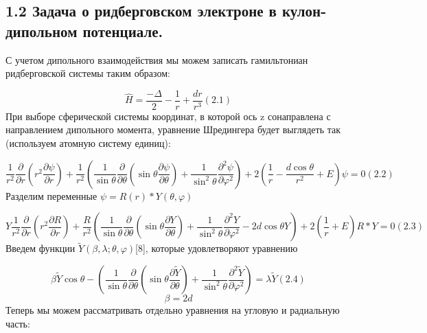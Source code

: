 \documentclass[a4paper]{article}
\begin{document}
\subsection{1.2 Задача о
ридберговском электроне в кулон-дипольном
потенциале.}
\hypertarget{RefHeading4673463868395}{}С учетом
дипольного взаимодействия мы можем записать гамильтониан ридберговской системы таким образом:

\begin{equation*}
\widehat  H=\frac{-{\Delta}} 2-\frac 1 r+\frac{\mathit{dr}}{r^3}(2.1)
\end{equation*}
При выборе сферической системы координат,
в которой ось \foreignlanguage{english}{z}
сонаправлена с направлением дипольного момента, уравнение Шредингера будет выглядеть так (используем атомную систему единиц):

\begin{equation*}
\frac 1{r^2}\frac{{\partial}}{{\partial}r}\left(r^2\frac{{\partial}\psi }{{\partial}r}\right)+\frac 1{r^2}\left(\frac
1{\sin \theta }\frac{{\partial}}{{\partial}\theta }\left(\sin \theta \frac{{\partial}\psi }{{\partial}\theta
}\right)+\frac 1{\sin ^2\theta }\frac{{\partial}^2\psi }{{\partial}\varphi ^2}\right)+2\left(\frac 1 r-\frac{d\cos
\theta }{r^2}+E\right)\psi =0(2.2)
\end{equation*}
Разделим
переменные  $\psi =R\left(r\right)\ast Y(\theta ,\varphi
)$

\begin{equation*}
Y\frac 1{r^2}\frac{{\partial}}{{\partial}r}\left(r^2\frac{{\partial}R}{{\partial}r}\right)+\frac R{r^2}\left(\frac
1{\sin \theta }\frac{{\partial}}{{\partial}\theta }\left(\sin \theta \frac{{\partial}Y}{{\partial}\theta }\right)+\frac
1{\sin ^2\theta }\frac{{\partial}^2Y}{{\partial}\varphi ^2}-2d\cos \theta Y\right)+2\left(\frac 1 r+E\right)R\ast
Y=0(2.3)
\end{equation*}
Введем функции  $\widetilde Y(\beta
,\lambda ;\theta ,\varphi )$[8], которые
удовлетворяют уравнению

\begin{equation*}
\beta \widetilde Y\cos \theta -\left(\frac 1{\sin \theta }\frac{{\partial}}{{\partial}\theta }\left(\sin \theta
\frac{{\partial}\widetilde Y}{{\partial}\theta }\right)+\frac 1{\sin ^2\theta }\frac{{\partial}^2\widetilde
Y}{{\partial}\varphi ^2}\right)=\lambda \widetilde Y(2.4)
\end{equation*}
\begin{equation*}
\beta =2d
\end{equation*}
Теперь мы можем рассматривать отдельно уравнения на угловую и радиальную часть:
\end{document}
